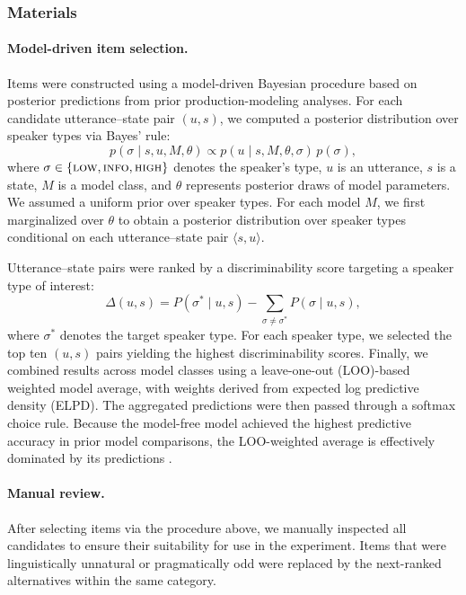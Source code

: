 \documentclass[11pt]{article}
\begin{document}
\subsubsection{Materials}
\paragraph{Model-driven item selection.}
Items were constructed using a model-driven Bayesian procedure based on posterior predictions from prior production-modeling analyses.
For each candidate utterance--state pair $(u,s)$, we computed a posterior distribution over speaker types via Bayes' rule:
\begin{equation}
	p(\sigma \mid s, u, M, \theta) \propto p(u \mid s, M, \theta, \sigma)\, p(\sigma),
\end{equation}
where $\sigma \in \{\textsc{low},\textsc{info},\textsc{high}\}$ denotes the speaker's type, $u$ is an utterance, $s$ is a state, $M$ is a model class, and $\theta$ represents posterior draws of model parameters.
We assumed a uniform prior over speaker types.
For each model $M$, we first marginalized over $\theta$ to obtain a posterior distribution over speaker types conditional on each utterance--state pair $\langle s,u \rangle$.

Utterance--state pairs were ranked by a discriminability score targeting a speaker type of interest:
\begin{equation}
	\Delta(u,s)
=
P(\sigma^{*} \mid u,s)
-
\sum_{\sigma \neq \sigma^{*}} P(\sigma \mid u,s),
\end{equation}
where $\sigma^{*}$ denotes the target speaker type.
For each speaker type, we selected the top ten $(u,s)$ pairs yielding the highest discriminability scores.
Finally, we combined results across model classes using a leave-one-out (LOO)-based weighted model average, with weights derived from expected log predictive density (ELPD).
The aggregated predictions were then passed through a softmax choice rule.
Because the model-free model achieved the highest predictive accuracy in prior model comparisons, the LOO-weighted average is effectively dominated by its predictions .

\paragraph{Manual review.}
After selecting items via the procedure above, we manually inspected all candidates to ensure their suitability for use in the experiment.
Items that were linguistically unnatural or pragmatically odd were replaced by the next-ranked alternatives within the same category.
\end{document}
